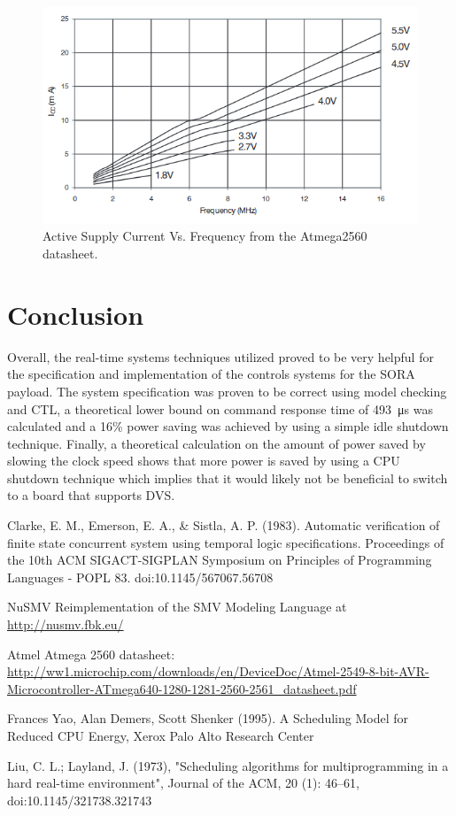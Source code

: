 \documentclass{article}
\begin{document}
\begin{figure}[H]
\centering
        \includegraphics[scale=.75]{powervfrequecy.png}
    \caption{Active Supply Current Vs. Frequency from the Atmega2560\cite{2560datasheet} datasheet.}
    \label{pwrvfreq}
\end{figure}


\section{Conclusion}
Overall, the real-time systems techniques utilized proved to be very helpful for the specification and implementation of the controls systems for the SORA payload. The system specification was proven to be correct using model checking and CTL,  a theoretical lower bound on command response time of \SI{493}{\micro\second} was calculated and a 16\% power saving was achieved by using a simple idle shutdown technique. Finally, a theoretical calculation on the amount of power saved by slowing the clock speed shows that more power is saved by using a CPU shutdown technique which implies that it would likely not be beneficial to switch to a board that supports DVS.
\pagebreak
\begin{thebibliography}{1}
Clarke, E. M., Emerson, E. A., \& Sistla, A. P. (1983). Automatic verification of finite state concurrent system using temporal logic specifications. Proceedings of the 10th ACM SIGACT-SIGPLAN Symposium on Principles of Programming Languages - POPL 83. doi:10.1145/567067.56708

NuSMV Reimplementation of the SMV Modeling Language at \href{http://nusmv.fbk.eu/}{http://nusmv.fbk.eu/}


Atmel Atmega 2560 datasheet: \href{http://ww1.microchip.com/downloads/en/DeviceDoc/Atmel-2549-8-bit-AVR-Microcontroller-ATmega640-1280-1281-2560-2561_datasheet.pdf}{\url{http://ww1.microchip.com/downloads/en/DeviceDoc/Atmel-2549-8-bit-AVR-Microcontroller-ATmega640-1280-1281-2560-2561_datasheet.pdf}}

Frances Yao, Alan Demers, Scott Shenker (1995).
A Scheduling Model for Reduced CPU Energy, Xerox Palo Alto Research Center

Liu, C. L.; Layland, J. (1973), "Scheduling algorithms for multiprogramming in a hard real-time environment", Journal of the ACM, 20 (1): 46–61, doi:10.1145/321738.321743
\end{thebibliography}
\end{document}
